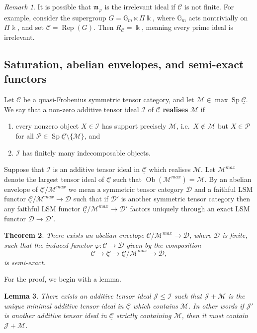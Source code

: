 \documentclass[11pt]{amsart}
\def\G{\mathbb{G}}
\def\JJ{\mathcal{J}}
\def\MM{\mathcal{M}}
\def\PP{\mathcal{P}}
\def\Cs{\mathcal{C}}
\def\II{\mathcal{I}}
\def\Cs{\mathscr{C}}
\def\Ds{\mathscr{D}}
\def\m{\mathfrak{m}}
\def\Rep{\operatorname{Rep}}
\def\ul{\underline}
\def\Sp{\operatorname{Sp}}
\newtheorem{thm}{Theorem}[section]
\newtheorem{lemma}[thm]{Lemma}
\theoremstyle{definition}
\theoremstyle{remark}
\newtheorem{remark}[thm]{Remark}
\numberwithin{equation}{section}
\begin{document}
\begin{remark}
    It is possible that $\m_{\varphi}$ is the irrelevant ideal if $\Cs$ is not finite.  For example, consider the supergroup $G=\G_m\ltimes\Pi\Bbbk$, where $\G_m$ acts nontrivially on $\Pi\Bbbk$, and set $\Cs=\Rep(G)$.  Then $R_{\Cs}=\Bbbk$, meaning every prime ideal is irrelevant.
\end{remark}

\subsection{Saturation, abelian envelopes, and semi-exact functors}\label{sec abel env}

Let $\Cs$ be a quasi-Frobenius symmetric tensor category, and let $\MM\in\max\Sp\ul{\Cs}$.    We say that a non-zero additive tensor ideal $\II$ of $\ul{\Cs}$ \textbf{realises} $\MM$ if
\begin{enumerate}
    \item every nonzero object $X\in\II$ has support precisely $\MM$, i.e.~$X\notin\MM$ but $X\in\PP$ for all $\PP\in\Sp\ul{\Cs}\setminus\{\MM\}$, and
    \item $\II$ has finitely many indecomposable objects.
\end{enumerate}

Suppose that $\II$ is an additive tensor ideal in $\ul{\Cs}$ which realises $\MM$. Let $\MM^{max}$ denote the largest tensor ideal of $\ul{\Cs}$ such that $\operatorname{Ob}(\MM^{max})=\MM$.  By an abelian envelope of $\ul{\Cs}/\MM^{max}$ we mean a symmetric tensor category $\Ds$ and a faithful LSM functor $\ul{\Cs}/\MM^{max}\to\Ds$ such that if $\Ds'$ is another symmetric tensor category then any faithful LSM functor $\ul{\Cs}/\MM^{max}\to\Ds'$ factors uniquely through an exact LSM functor $\Ds\to\Ds'$.

\begin{thm}\label{thm abelian envelope semi exact}
    There exists an abelian envelope $\ul{\Cs}/\MM^{max}\to\Ds$, where $\Ds$ is finite, such that the induced functor $\varphi:\Cs\to\Ds$ given by the composition
    \[
    \Cs\to\ul{\Cs}\to\ul{\Cs}/\MM^{max}\to\Ds,
    \]
    is semi-exact.
\end{thm}

For the proof, we begin with a lemma.
\begin{lemma}\label{lemma unique cover}
     There exists an additive tensor ideal $\JJ\leq\II$ such that $\JJ+\MM$ is the unique minimal additive tensor ideal in $\ul{\Cs}$ which contains $\MM$.  In other words if $\JJ'$ is another additive tensor ideal in $\ul{\Cs}$ strictly containing $\MM$, then it must contain $\JJ+\MM$.  
\end{lemma}
\end{document}
